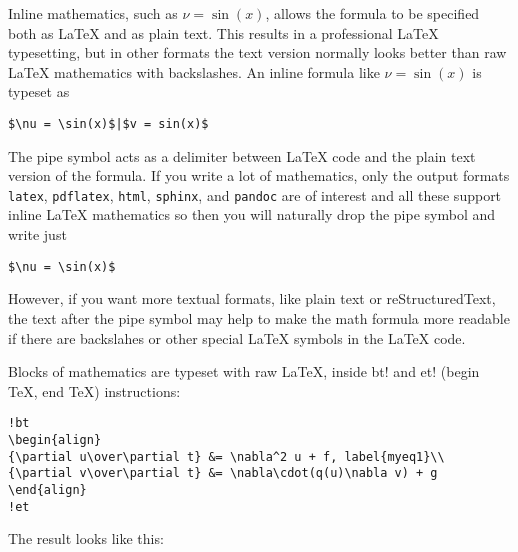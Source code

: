 \documentclass[%
oneside,                 %
final,                   %
10pt]{article}
\begin{document}
Inline mathematics, such as $\nu = \sin(x)$,
allows the formula to be specified both as {\LaTeX} and as plain text.
This results in a professional {\LaTeX} typesetting, but in other formats
the text version normally looks better than raw {\LaTeX} mathematics with
backslashes. An inline formula like $\nu = \sin(x)$ is
typeset as

\begin{Verbatim}[fontsize=\fontsize{9pt}{9pt},tabsize=8,baselinestretch=0.85,
fontfamily=tt,xleftmargin=7mm]
$\nu = \sin(x)$|$v = sin(x)$
\end{Verbatim}
\noindent
The pipe symbol acts as a delimiter between {\LaTeX} code and the plain text
version of the formula. If you write a lot of mathematics, only the
output formats {\fontsize{10pt}{10pt}\Verb!latex!}, {\fontsize{10pt}{10pt}\Verb!pdflatex!}, {\fontsize{10pt}{10pt}\Verb!html!}, {\fontsize{10pt}{10pt}\Verb!sphinx!}, and {\fontsize{10pt}{10pt}\Verb!pandoc!}
are of interest
and all these support inline {\LaTeX} mathematics so then you will naturally
drop the pipe symbol and write just

\begin{Verbatim}[fontsize=\fontsize{9pt}{9pt},tabsize=8,baselinestretch=0.85,
fontfamily=tt,xleftmargin=7mm]
$\nu = \sin(x)$
\end{Verbatim}
\noindent
However, if you want more textual formats, like plain text or reStructuredText,
the text after the pipe symbol may help to make the math formula more readable
if there are backslahes or other special {\LaTeX} symbols in the {\LaTeX} code.

Blocks of mathematics are typeset with raw {\LaTeX}, inside
{\fontsize{10pt}{10pt}\Verb!!bt!} and {\fontsize{10pt}{10pt}\Verb!!et!} (begin TeX, end TeX) instructions:

\begin{Verbatim}[fontsize=\fontsize{9pt}{9pt},tabsize=8,baselinestretch=0.85,
fontfamily=tt,xleftmargin=7mm]
!bt
\begin{align}
{\partial u\over\partial t} &= \nabla^2 u + f, label{myeq1}\\
{\partial v\over\partial t} &= \nabla\cdot(q(u)\nabla v) + g
\end{align}
!et
\end{Verbatim}
\noindent
The result looks like this:
\end{document}
